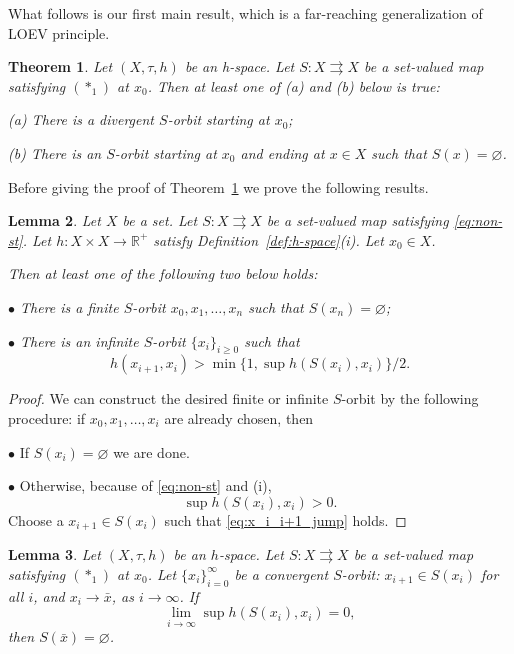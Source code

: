 \documentclass[12pt]{article}
\newtheorem{theorem}{Theorem}[section]
\newtheorem{lemma}[theorem]{Lemma}
\newcommand{\astone}{(\ast_1)}
\renewcommand{\emptyset}{\varnothing}
\begin{document}
What follows is our first main result, which is a far-reaching generalization of LOEV principle.
\begin{theorem}
    \label{thm:loev-topo}
Let $(X,\tau,h)$ be an h-space. Let $S:X\rightrightarrows X$ be a set-valued map satisfying $\astone$ at $x_0$. Then at least one of (a) and (b) below is true:

(a) There is a divergent $S$-orbit starting at $x_0$;

(b) There is an $S$-orbit starting at $x_0$ and ending at $  x\in X$ such that $S( {x})=\varnothing$.
\end{theorem}
Before giving the proof of Theorem~\ref{thm:loev-topo} we prove the following results.
\begin{lemma}
    \label{lem:loev-induction}
    Let $X$ be a set. Let $S:X\rightrightarrows X$ be a set-valued map satisfying \eqref{eq:non-st}. Let $h:X\times X\to\mathbb{R}^+$ satisfy    \emph{Definition~\ref{def:h-space}(i)}. Let $x_0\in X$.

    Then at least one of the following two below holds:

        $\bullet$ There is a finite $S$-orbit $x_0,x_1,\ldots,x_n$ such that $S(x_n) = \emptyset$;
        
        $\bullet$ There is an infinite $S$-orbit $\{x_i\}_{i\ge0}$ such that
\begin{equation}\label{eq:x_i_i+1_jump}
            h(x_{i+1},x_i) > \min\{1,\sup h\left(S(x_i),x_i\right)\}/2.
        \end{equation}
\end{lemma}
\begin{proof}
    We can construct the desired finite or infinite $S$-orbit by the following procedure: if $x_0,x_1,\dots,x_i$ are already chosen, then

$\bullet$ If  $S(x_i)=\varnothing$  we are done.

$\bullet$  Otherwise, because of \eqref{eq:non-st} and (i),
$$
    \sup h(S(x_i),x_i) > 0.
$$
Choose a $x_{i+1}\in S(x_i)$ such that \eqref{eq:x_i_i+1_jump} holds.
\end{proof}
\begin{lemma}
    \label{lem:to0-empty}
    Let $(X,\tau,h)$ be an $h$-space. Let $S:X\rightrightarrows X$ be a set-valued map satisfying $\astone$ at $x_0$. Let $\{x_i\}_{i=0}^\infty$ be a convergent $S$-orbit: $x_{i+1}\in S(x_i)$ for all $i$, and $x_i\to\bar x$, as $i\to\infty$. If
    \begin{equation}
        \label{eq:sup-diam-0}
        \lim_{i\to\infty} \sup h\left(S(x_i),x_i\right) = 0,
    \end{equation}
    then $S(\bar x) = \emptyset$.
\end{lemma}
\end{document}
